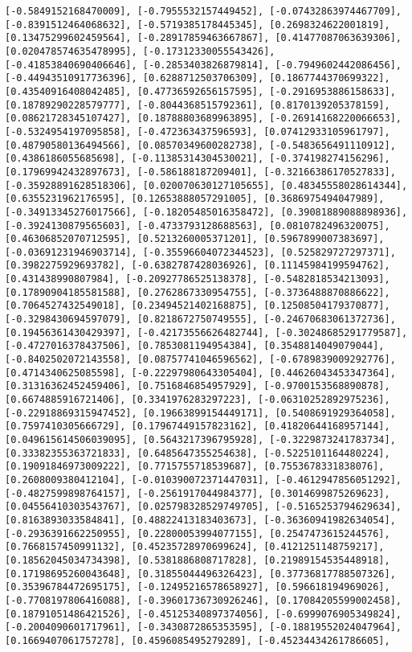 \documentclass[11pt]{article}
\begin{document}
\begin{Verbatim}[commandchars=\\\{\}]
[-0.5849152168470009], [-0.7955532157449452], [-0.07432863974467709], [-0.8391512464068632], [-0.5719385178445345], [0.2698324622001819], [0.13475299602459564], [-0.28917859463667867], [0.41477087063639306], [0.020478574635478995], [-0.17312330055543426], [-0.41853840690406646], [-0.2853403826879814], [-0.7949602442086456], [-0.44943510917736396], [0.6288712503706309], [0.1867744370699322], [0.43540916408042485], [0.47736592656157595], [-0.2916953886158633], [0.18789290228579777], [-0.8044368515792361], [0.8170139205378159], [0.08621728345107427], [0.18788803689963895], [-0.26914168220066653], [-0.5324954197095858], [-0.472363437596593], [0.07412933105961797], [0.48790580136494566], [0.08570349600282738], [-0.5483656491110912], [0.4386186055685698], [-0.11385314304530021], [-0.374198274156296], [0.17969942432897673], [-0.586188187209401], [-0.32166386170527833], [-0.35928891628518306], [0.020070630127105655], [0.48345558028614344], [0.6355231962176595], [0.12653888057291005], [0.3686975494047989], [-0.34913345276017566], [-0.18205485016358472], [0.39081889088898936], [-0.3924130879565603], [-0.4733793128688563], [0.0810782496320075], [0.46306852070712595], [0.5213260005371201], [0.5967899007383697], [-0.03691231946903714], [-0.35596604072344523], [0.525829727297371], [0.3982275929693782], [-0.6382787428036926], [0.11145984199594762], [0.431438990807984], [-0.20927786525138378], [-0.5482818534213093], [0.17890904185581588], [0.2762867330954755], [-0.3736488870886622], [0.7064527432549018], [0.23494521402168875], [0.12508504179370877], [-0.3298430694597079], [0.8218672750749555], [-0.24670683061372736], [0.19456361430429397], [-0.42173556626482744], [-0.30248685291779587], [-0.4727016378437506], [0.7853081194954384], [0.3548814049079044], [-0.8402502072143558], [0.08757741046596562], [-0.6789839009292776], [0.4714340625085598], [-0.22297980643305404], [0.44626043453347364], [0.31316362452459406], [0.7516846854957929], [-0.9700153568890878], [0.6674885916721406], [0.3341976283297223], [-0.06310252892975236], [-0.22918869315947452], [0.19663899154449171], [0.5408691929364058], [0.7597410305666729], [0.17967449157823162], [0.41820644168957144], [0.049615614506039095], [0.5643217396795928], [-0.3229873241783734], [0.33382355363721833], [0.6485647355254638], [-0.5225101164480224], [0.19091846973009222], [0.7715755718539687], [0.7553678331838076], [0.2608009380412104], [-0.010390072371447031], [-0.4612947856051292], [-0.4827599898764157], [-0.2561917044984377], [0.3014699875269623], [0.04556410303543767], [0.025798328529749705], [-0.5165253794629634], [0.8163893033584841], [0.48822413183403673], [-0.36360941982634054], [-0.2936391662250955], [0.22800053994077155], [0.2547473615244576], [0.7668157450991132], [0.45235728970699624], [0.4121251148759217], [0.18562045034734398], [0.5381886808717828], [0.21989154535448918], [0.17198695260043648], [0.31855044496326423], [0.37736817788507326], [0.35396784472695175], [-0.12495216578658927], [0.596618194969026], [-0.7708197806416088], [-0.39601736730926246], [0.17084205599002458], [0.18791051486421526], [-0.45125340897374056], [-0.6999076905349824], [-0.2004090601717961], [-0.3430872865353595], [-0.18819552024047964], [0.1669407061757278], [0.4596085495279289], [-0.45234434261786605], 
\end{Verbatim}
\end{document}
